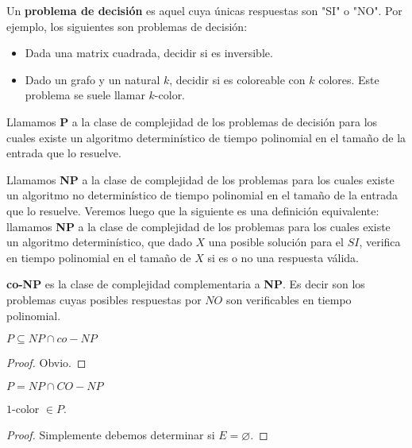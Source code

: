 \begin{definition}
Un \textbf{problema de decisión} es aquel cuya únicas respuestas son "SI" o "NO".
Por ejemplo, los siguientes son problemas de decisión:
\begin{itemize}
    \item Dada una matrix cuadrada, decidir si es inversible.
    \item Dado un grafo y un natural $k$, decidir si es coloreable con $k$ colores. Este problema se suele llamar $k$-color.
\end{itemize}
\end{definition}

\begin{definition}
Llamamos \textbf{P} a la clase de complejidad de los problemas de decisión para los cuales existe un algoritmo determinístico de tiempo polinomial en el tamaño de la entrada que lo resuelve.
\end{definition}

\begin{definition}
Llamamos \textbf{NP} a la clase de complejidad de los problemas para los cuales existe un algoritmo no determinístico de tiempo polinomial en el tamaño de la entrada que lo resuelve.
Veremos luego que la siguiente es una definición equivalente: llamamos \textbf{NP} a la clase de complejidad de los problemas para los cuales existe un algoritmo determinístico, que dado $X$ una posible solución para el $SI$, verifica en tiempo polinomial en el tamaño de $X$ si es o no una respuesta válida. 
\end{definition}

\begin{definition}
\textbf{co-NP} es la clase de complejidad complementaria a \textbf{NP}. Es decir son los problemas cuyas posibles respuestas por $NO$ son verificables en tiempo polinomial.
\end{definition}

\begin{proposition}
$P \subseteq NP \cap co-NP$
\end{proposition}
\begin{proof}
Obvio.
\end{proof}

\begin{conjecture}
$P = NP \cap CO-NP$
\end{conjecture}

\begin{proposition}
$1$-color $\in P$.
\end{proposition}
\begin{proof}
Simplemente debemos determinar si $E = \varnothing$.
\end{proof}

